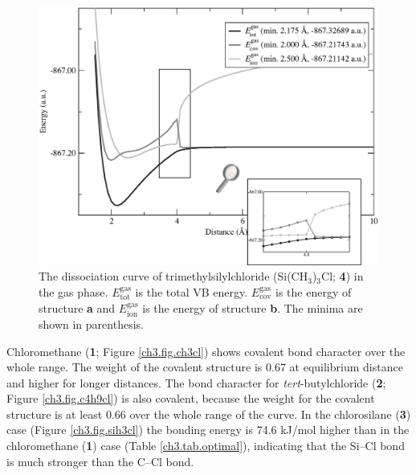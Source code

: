 \begin{figure}[h]
\begin{center}
\includegraphics[scale=0.55]{dissociation/figures/c3h9sicl_g.eps}
\end{center}
\caption{The dissociation curve of trimethylsilylchloride (Si(CH$_3$)$_3$Cl; \textbf{4}) in the gas phase. $E_\mathrm{tot}^\mathrm{gas}$ is the total VB energy. $E_\mathrm{cov}^\mathrm{gas}$ is the energy of structure \textbf{a} and $E_\mathrm{ion}^\mathrm{gas}$ is the energy of structure \textbf{b}. The minima are shown in parenthesis.}
\label{ch3.fig.c3h9sicl}
\end{figure}
Chloromethane (\textbf{1}; Figure \ref{ch3.fig.ch3cl}) shows covalent bond character over the whole range. The weight of the covalent structure is 0.67 at equilibrium distance and higher for longer distances. The bond character for \textit{tert}-butylchloride (\textbf{2}; Figure \ref{ch3.fig.c4h9cl}) is also covalent, because the weight for the covalent structure is at least 0.66 over the whole range of the curve. In the chlorosilane (\textbf{3}) case (Figure \ref{ch3.fig.sih3cl}) the bonding energy is 74.6 kJ/mol higher than in the chloromethane (\textbf{1}) case (Table \ref{ch3.tab.optimal}), indicating that the Si--Cl bond is much stronger than the C--Cl bond. 


